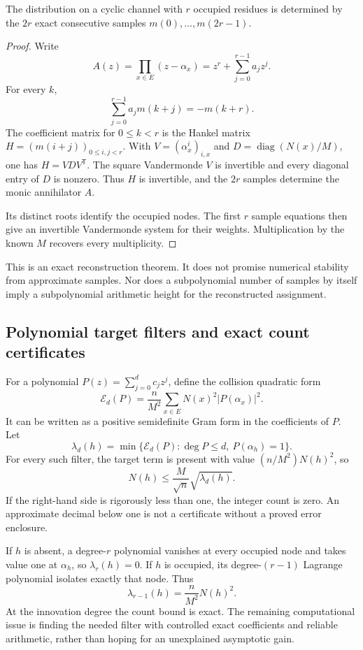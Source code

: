 \begin{theorem}\label{thm:prony}
The distribution on a cyclic channel with $r$ occupied residues is determined by the $2r$ exact consecutive samples $m(0),\ldots,m(2r-1)$.
\end{theorem}
\begin{proof}
Write
\[
 A(z)=\prod_{x\in E}(z-\alpha_x)=z^r+\sum_{j=0}^{r-1}a_jz^j.
\]
For every $k$,
\[
 \sum_{j=0}^{r-1}a_jm(k+j)=-m(k+r).
\]
The coefficient matrix for $0\le k<r$ is the Hankel matrix $H=(m(i+j))_{0\le i,j<r}$. With $V=(\alpha_x^i)_{i,x}$ and $D=\operatorname{diag}(N(x)/M)$, one has $H=VDV^{\mathsf T}$. The square Vandermonde $V$ is invertible and every diagonal entry of $D$ is nonzero. Thus $H$ is invertible, and the $2r$ samples determine the monic annihilator $A$.

Its distinct roots identify the occupied nodes. The first $r$ sample equations then give an invertible Vandermonde system for their weights. Multiplication by the known $M$ recovers every multiplicity.
\end{proof}
This is an exact reconstruction theorem. It does not promise numerical stability from approximate samples. Nor does a subpolynomial number of samples by itself imply a subpolynomial arithmetic height for the reconstructed assignment.

\subsection{Polynomial target filters and exact count certificates}
For a polynomial $P(z)=\sum_{j=0}^dc_jz^j$, define the collision quadratic form
\[
 \mathcal E_d(P)=\frac n{M^2}\sum_{x\in E}N(x)^2|P(\alpha_x)|^2.
\]
It can be written as a positive semidefinite Gram form in the coefficients of $P$. Let
\[
 \lambda_d(h)=\min\{\mathcal E_d(P):\deg P\le d,\ P(\alpha_h)=1\}.
\]
For every such filter, the target term is present with value $(n/M^2)N(h)^2$, so
\[
 N(h)\le\frac M{\sqrt n}\sqrt{\lambda_d(h)}.
\]
If the right-hand side is rigorously less than one, the integer count is zero. An approximate decimal below one is not a certificate without a proved error enclosure.

If $h$ is absent, a degree-$r$ polynomial vanishes at every occupied node and takes value one at $\alpha_h$, so $\lambda_r(h)=0$. If $h$ is occupied, its degree-$(r-1)$ Lagrange polynomial isolates exactly that node. Thus
\[
 \lambda_{r-1}(h)=\frac n{M^2}N(h)^2.
\]
At the innovation degree the count bound is exact. The remaining computational issue is finding the needed filter with controlled exact coefficients and reliable arithmetic, rather than hoping for an unexplained asymptotic gain.

